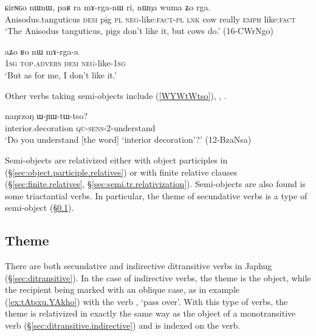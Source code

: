 \begin{exe}
\ex \label{ex:paR.ra.mArganW}
\gll ɕirɴɢo nɯnɯ, paʁ ra mɤ-rga-nɯ ri, nɯŋa wuma ʑo rga.\\
Anisodus.tanguticus \textsc{dem} pig \textsc{pl} \textsc{neg}-like:\textsc{fact}-\textsc{pl} \textsc{lnk} cow really \textsc{emph} like:\textsc{fact} \\
\glt `The Anisodus tanguticus, pigs don't like it, but cows do.' (16-CWrNgo)
\end{exe}

\begin{exe}
\ex \label{ex:aZo.Ro.nW.mArgaa}
\gll aʑo ʁo nɯ mɤ-rga-a \\
\textsc{1sg}  \textsc{top}.\textsc{advers} \textsc{dem} \textsc{neg}-like-\textsc{1sg} \\
\glt `But as for me, I don't like it.' 
\end{exe}


Other verbs taking semi-objects include  (\ref{WYWtWtso}), , .

\begin{exe}
\ex \label{WYWtWtso}
 \gll naŋrzoŋ ɯ-ɲɯ-tɯ-tso? \\
interior.decoration \textsc{qu}-\textsc{sens}-2-understand \\
\glt `Do you understand [the word] `interior decoration'?' (12-BzaNsa) 
\end{exe}

   
Semi-objects are relativized either with object participles in  (§\ref{sec:object.participle.relatives}) or with finite relative clauses (§\ref{sec:finite.relatives}, §\ref{sec:semi.tr.relativization}). Semi-objects are also found is some triactantial verbs. In particular, the theme of secundative verbs is a type of semi-object (§\ref{sec:theme.ditransitive}).

\subsection{Theme}  \label{sec:theme.ditransitive}
    
There are both secundative and indirective ditransitive verbs in Japhug (§\ref{sec:ditransitive}). In the case of indirective verbs, the theme is the object, while the recipient being marked with an oblique case, as in example (\ref{ex:tAtsxu.YAkho}) with the verb  , `pass over'. With this type of verbs, the theme is relativized in exactly the same way as the object of a monotransitive verb (§\ref{sec:ditransitive.indirective}) and is indexed on the verb.

